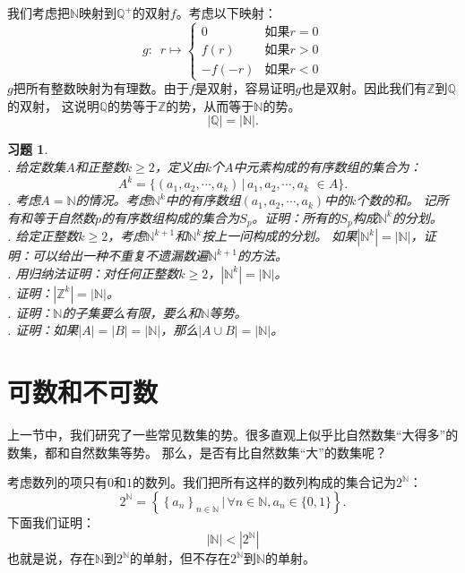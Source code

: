 \documentclass[12pt,UTF8]{ctexbook}
\newtheorem{sk}{思考}[section]
\newtheorem{xt}{习题}[section]
\begin{document}
我们考虑把$\mathbb{N}$映射到$\mathbb{Q}^+$的双射$f$。考虑以下映射：
$$ g:\,\,\,r\mapsto \left\{
    \begin{array}{cl}
        0 & \mbox{如果}r = 0 \\
        f(r) & \mbox{如果}r > 0 \\
        -f(-r)  & \mbox{如果}r < 0 
    \end{array}\right.
$$
$g$把所有整数映射为有理数。由于$f$是双射，容易证明$g$也是双射。因此我们有$\mathbb{Z}$到$\mathbb{Q}$的双射，
这说明$\mathbb{Q}$的势等于$\mathbb{Z}$的势，从而等于$\mathbb{N}$的势。
$$ |\mathbb{Q}| = |\mathbb{N}|.$$



\begin{xt}
    \mbox{} \\
    . 给定数集$A$和正整数$k\geqslant 2$，定义由$k$个$A$中元素构成的有序数组的集合为：
    $$ A^k = \{(a_1, a_2, \cdots, a_k) \, | \, a_1, a_2, \cdots, a_k \,\, \in A \}.$$
    . 考虑$A = \mathbb{N}$的情况。考虑$\mathbb{N}^k$中的有序数组$(a_1, a_2, \cdots, a_k)$中的$k$个数的和。
    记所有和等于自然数$p$的有序数组构成的集合为$S_p$。证明：所有的$S_p$构成$\mathbb{N}^k$的分划。\\
    . 给定正整数$k\geqslant 2$，考虑$\mathbb{N}^{k+1}$和$\mathbb{N}^{k}$按上一问构成的分划。
    如果$|\mathbb{N}^k| = |\mathbb{N}|$，证明：可以给出一种不重复不遗漏数遍$\mathbb{N}^{k+1}$的方法。\\
    . 用归纳法证明：对任何正整数$k\geqslant 2$，$|\mathbb{N}^k| = |\mathbb{N}|$。\\
    . 证明：$|\mathbb{Z}^k| = |\mathbb{N}|$。\\
    . 证明：$\mathbb{N}$的子集要么有限，要么和$\mathbb{N}$等势。\\
    . 证明：如果$|A| = |B| = |\mathbb{N}|$，那么$|A\cup B| = |\mathbb{N}|$。
\end{xt}

\section{可数和不可数}
上一节中，我们研究了一些常见数集的势。很多直观上似乎比自然数集“大得多”的数集，都和自然数集等势。
那么，是否有比自然数集“大”的数集呢？

考虑数列的项只有$0$和$1$的数列。我们把所有这样的数列构成的集合记为$2^\mathbb{N}$：
$$ 2^\mathbb{N} = \left\{\left\{a_n\right\}_{n\in\mathbb{N}} \, | \, \forall n\in\mathbb{N}, a_n \in \{0, 1\} \right\}. $$
下面我们证明：
$$|\mathbb{N}| < |2^\mathbb{N}|$$
也就是说，存在$\mathbb{N}$到$2^\mathbb{N}$的单射，但不存在$2^\mathbb{N}$到$\mathbb{N}$的单射。
\end{document}
